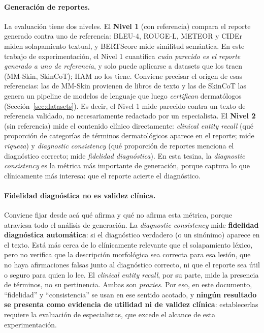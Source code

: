 \documentclass[11pt, a4paper]{article}
\begin{document}
\paragraph{Generación de reportes.} La evaluación tiene dos niveles. El \textbf{Nivel 1} (con
referencia) compara el reporte generado contra uno de referencia: BLEU-4, ROUGE-L, METEOR y CIDEr miden
solapamiento textual, y BERTScore mide similitud semántica. En este trabajo de experimentación, el Nivel 1 cuantifica
\emph{cuán parecido es el reporte generado a uno de referencia}, y solo puede aplicarse a
datasets que los traen (MM-Skin, SkinCoT); HAM no los tiene. Conviene precisar el origen de esas
referencias: las de MM-Skin provienen de libros de texto y las de SkinCoT las genera un pipeline de
modelos de lenguaje que luego \emph{certifican} dermatólogos (Sección~\ref{sec:datasets}). Es decir, el
Nivel 1 mide parecido contra un texto de referencia validado, no necesariamente redactado por un
especialista. El \textbf{Nivel 2} (sin
referencia) mide el contenido clínico directamente: \emph{clinical entity recall} (qué proporción de
categorías de términos dermatológicos aparece en el reporte; mide \emph{riqueza}) y \emph{diagnostic
consistency} (qué proporción de reportes menciona el diagnóstico correcto; mide \emph{fidelidad
diagnóstica}). En esta tesina, la \emph{diagnostic consistency} es la métrica más importante de
generación, porque captura lo que clínicamente más interesa: que el reporte acierte el diagnóstico.
\paragraph{Fidelidad diagnóstica no es validez clínica.} Conviene fijar desde acá qué afirma y qué no
afirma esta métrica, porque atraviesa todo el análisis de generación. La \emph{diagnostic consistency}
mide \textbf{fidelidad diagnóstica automática}: si el diagnóstico verdadero (o un sinónimo) aparece en el
texto. Está más cerca de lo clínicamente relevante que el solapamiento léxico, pero no verifica que la
descripción morfológica sea correcta para esa lesión, que no haya afirmaciones falsas junto al
diagnóstico correcto, ni que el reporte sea útil o seguro para quien lo lee. El \emph{clinical entity
recall}, por su parte, mide la presencia de términos, no su pertinencia. Ambas son \emph{proxies}. Por
eso, en este documento, ``fidelidad'' y ``consistencia'' se usan en ese sentido acotado, y
\textbf{ningún resultado se presenta como evidencia de utilidad ni de validez clínica}: establecerlas
requiere la evaluación de especialistas, que excede el alcance de esta experimentación.
\end{document}
